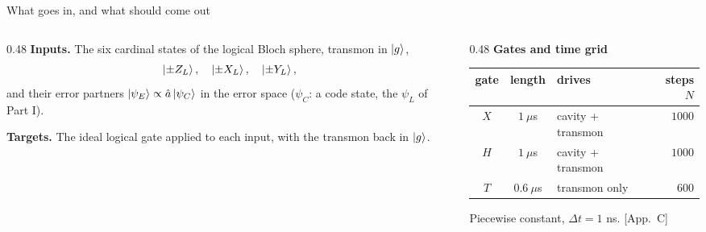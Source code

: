 \begin{frame}{What goes in, and what should come out}
  \begin{columns}[T]
    \begin{column}{0.48\textwidth}
      \textbf{Inputs.} The six cardinal states of the logical Bloch sphere, transmon in
      $\left|g\right\rangle$,
      \[
        \left|\pm Z_L\right\rangle,\quad \left|\pm X_L\right\rangle,\quad \left|\pm Y_L\right\rangle,
      \]
      and their error partners $\left|\psi_E\right\rangle \propto \hat{a}\left|\psi_C\right\rangle$ in the error space
      ($\psi_C$: a code state, the $\psi_L$ of Part I).

      \medskip
      \textbf{Targets.} The ideal logical gate applied to each input, with the transmon back
      in $\left|g\right\rangle$.
    \end{column}
    \begin{column}{0.48\textwidth}
      \textbf{Gates and time grid}

      \smallskip
      {\small
      \renewcommand{\arraystretch}{1.25}
      \begin{tabular}{@{}c c l r@{}}
        gate & length & drives & steps $N$ \\
        \hline
        $X$ & $1\ \mu$s   & cavity + transmon & $1000$ \\
        $H$ & $1\ \mu$s   & cavity + transmon & $1000$ \\
        $T$ & $0.6\ \mu$s & transmon only     & $600$ \\
        \hline
      \end{tabular}}

      \smallskip
      {\color{tagmid}\scriptsize Piecewise constant, $\Delta t = 1$ ns. \hfill [App.~C]}
    \end{column}
  \end{columns}


\end{frame}
